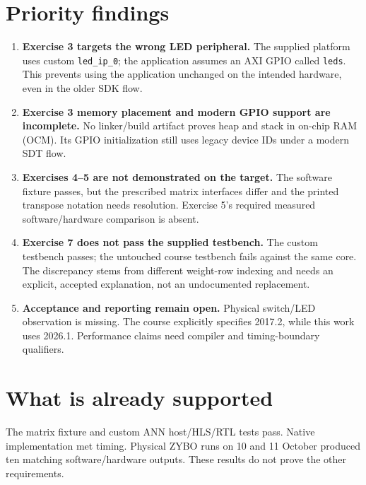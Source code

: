 \documentclass[11pt,a4paper]{article}
\begin{document}
\section*{Priority findings}
\begin{enumerate}
\item \textbf{Exercise 3 targets the wrong LED peripheral.} The supplied
platform uses custom \texttt{led\_ip\_0}; the application assumes an AXI GPIO
called \texttt{leds}. This prevents using the application unchanged on the
intended hardware, even in the older SDK flow.
\item \textbf{Exercise 3 memory placement and modern GPIO support are incomplete.}
No linker/build artifact proves heap and stack in on-chip RAM (OCM).
Its GPIO initialization still uses legacy device IDs under a modern SDT flow.
\item \textbf{Exercises 4--5 are not demonstrated on the target.} The software
fixture passes, but the prescribed matrix interfaces differ and the printed
transpose notation needs resolution. Exercise 5's required measured
software/hardware comparison is absent.
\item \textbf{Exercise 7 does not pass the supplied testbench.} The custom
testbench passes; the untouched course testbench fails against the same core.
The discrepancy stems from different weight-row indexing and needs an explicit,
accepted explanation, not an undocumented replacement.
\item \textbf{Acceptance and reporting remain open.} Physical switch/LED
observation is missing. The course explicitly specifies 2017.2, while this
work uses 2026.1. Performance claims need compiler and timing-boundary qualifiers.
\end{enumerate}

\section*{What is already supported}
The matrix fixture and custom ANN host/HLS/RTL tests pass. Native implementation
met timing. Physical ZYBO runs on 10 and 11 October produced ten matching
software/hardware outputs. These results do not prove the other requirements.

\newpage
\end{document}
